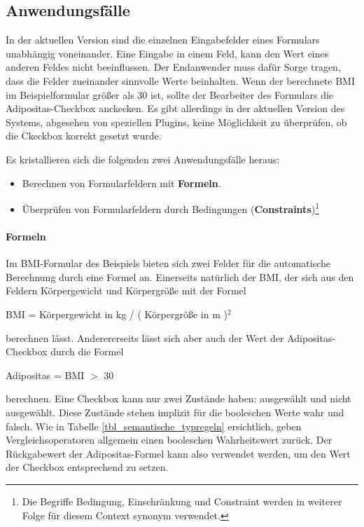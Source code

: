 \subsection{Anwendungsfälle}

In der aktuellen Version sind die einzelnen Eingabefelder eines Formulars unabhängig voneinander. Eine Eingabe in einem Feld, kann den Wert eines anderen Feldes nicht beeinflussen. Der Endanwender muss dafür Sorge tragen, dass die Felder zueinander sinnvolle Werte beinhalten. Wenn der berechnete BMI im Beispielformular größer als 30 ist, sollte der Bearbeiter des Formulars die Adipositas-Checkbox anckecken. Es gibt allerdings in der aktuellen Version des Systems, abgesehen von speziellen Plugins, keine Möglichkeit zu überprüfen, ob die Ckeckbox korrekt gesetzt wurde.

Es kristallieren sich die folgenden zwei Anwendungsfälle heraus:

\begin{itemize}
  \item Berechnen von Formularfeldern mit \textbf{Formeln}.
  \item Überprüfen von Formularfeldern durch Bedingungen (\textbf{Constraints})\footnote{Die Begriffe Bedingung, Einschränkung und Constraint werden in weiterer Folge für diesem Context synonym verwendet.}
\end{itemize}

\paragraph{Formeln} 

Im BMI-Formular des Beispiels bieten sich zwei Felder für die automatische Berechnung durch eine Formel an. Einerseits natürlich der BMI, der sich aus den Feldern Körpergewicht und Kör\-per\-grö\-ße mit der Formel

\begin{center}
 BMI = Körpergewicht in kg / ( Kör\-per\-grö\-ße in m )$ ^2 $
\end{center}

berechnen lässt. Anderererseits lässt sich aber auch der Wert der Adipositas-Checkbox durch die Formel

\begin{center}
 Adipositas = BMI $ > $ 30
\end{center}

berechnen. Eine Checkbox kann nur zwei Zustände haben: ausgewählt und nicht ausgewählt. Diese Zustände stehen implizit für die booleschen Werte wahr und falsch. Wie in Tabelle \ref{tbl_semantische_typregeln} ersichtlich, geben Vergleichsoperatoren allgemein einen booleschen Wahrheitswert zurück. Der Rückgabewert der Adipositas-Formel kann also verwendet werden, um den Wert der Checkbox ent\-sprech\-end zu setzen.

